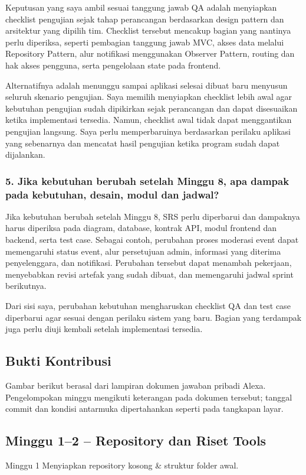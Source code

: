 \documentclass[11pt,a4paper]{article}
\begin{document}
Keputusan yang saya ambil sesuai tanggung jawab QA adalah menyiapkan checklist pengujian sejak tahap perancangan berdasarkan design pattern dan arsitektur yang dipilih tim. Checklist tersebut mencakup bagian yang nantinya perlu diperiksa, seperti pembagian tanggung jawab MVC, akses data melalui Repository Pattern, alur notifikasi menggunakan Observer Pattern, routing dan hak akses pengguna, serta pengelolaan state pada frontend.

Alternatifnya adalah menunggu sampai aplikasi selesai dibuat baru menyusun seluruh skenario pengujian. Saya memilih menyiapkan checklist lebih awal agar kebutuhan pengujian sudah dipikirkan sejak perancangan dan dapat disesuaikan ketika implementasi tersedia. Namun, checklist awal tidak dapat menggantikan pengujian langsung. Saya perlu memperbaruinya berdasarkan perilaku aplikasi yang sebenarnya dan mencatat hasil pengujian ketika program sudah dapat dijalankan.



\subsubsection*{5. Jika kebutuhan berubah setelah Minggu 8, apa dampak pada kebutuhan, desain, modul dan jadwal?}

Jika kebutuhan berubah setelah Minggu 8, SRS perlu diperbarui dan dampaknya harus diperiksa pada diagram, database, kontrak API, modul frontend dan backend, serta test case. Sebagai contoh, perubahan proses moderasi event dapat memengaruhi status event, alur persetujuan admin, informasi yang diterima penyelenggara, dan notifikasi. Perubahan tersebut dapat menambah pekerjaan, menyebabkan revisi artefak yang sudah dibuat, dan memengaruhi jadwal sprint berikutnya.

Dari sisi saya, perubahan kebutuhan mengharuskan checklist QA dan test case diperbarui agar sesuai dengan perilaku sistem yang baru. Bagian yang terdampak juga perlu diuji kembali setelah implementasi tersedia.


\clearpage\subsection*{Bukti Kontribusi}
Gambar berikut berasal dari lampiran dokumen jawaban pribadi Alexa. Pengelompokan minggu mengikuti keterangan pada dokumen tersebut; tanggal commit dan kondisi antarmuka dipertahankan seperti pada tangkapan layar.

\subsection*{Minggu 1--2 -- Repository dan Riset Tools}
Minggu 1 Menyiapkan repository kosong \& struktur folder awal.
\end{document}
